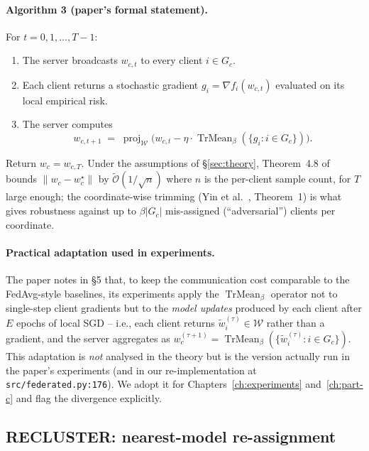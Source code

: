 \paragraph{Algorithm 3 (paper's formal statement).} For $t = 0, 1, \dots, T-1$:
\begin{enumerate}
    \item The server broadcasts $w_{c,t}$ to every client $i \in G_c$.
    \item Each client returns a stochastic gradient $g_i = \nabla f_i(w_{c,t})$ evaluated on its local empirical risk.
    \item The server computes
    \begin{equation}\label{eq:tmgd-step}
        w_{c,t+1} \;=\; \operatorname{proj}_{\mathcal{W}}\!\bigl(w_{c,t} - \eta \cdot \operatorname{TrMean}_\beta(\{g_i : i \in G_c\})\bigr).
    \end{equation}
\end{enumerate}
Return $w_c = w_{c,T}$. Under the assumptions of §\ref{sec:theory}, Theorem~4.8 of~\parencite{vardhan2024srfca} bounds $\lVert w_c - w_c^\star\rVert$ by $\tilde{\mathcal{O}}(1/\sqrt{n})$ where $n$ is the per-client sample count, for $T$ large enough; the coordinate-wise trimming (Yin et al.~\parencite{yin2018trimmedmean}, Theorem~1) is what gives robustness against up to $\beta |G_c|$ mis-assigned (``adversarial'') clients per coordinate.

\paragraph{Practical adaptation used in experiments.} The paper notes in §5 that, to keep the communication cost comparable to the FedAvg-style baselines, its experiments apply the $\operatorname{TrMean}_\beta$ operator not to single-step client gradients but to the \emph{model updates} produced by each client after $E$ epochs of local SGD -- i.e., each client returns $\tilde{w}_i^{(\tau)} \in \mathcal{W}$ rather than a gradient, and the server aggregates as $w_c^{(\tau+1)} = \operatorname{TrMean}_\beta(\{\tilde{w}_i^{(\tau)} : i \in G_c\})$. This adaptation is \emph{not} analysed in the theory but is the version actually run in the paper's experiments (and in our re-implementation at \texttt{src/federated.py:176}). We adopt it for Chapters~\ref{ch:experiments} and~\ref{ch:part-c} and flag the divergence explicitly.

\subsection{RECLUSTER: nearest-model re-assignment}\label{sec:recluster}

